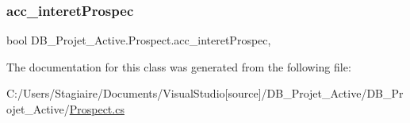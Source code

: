 \subsubsection{\texorpdfstring{acc\_interetProspec}{acc\_interetProspec}}
{\footnotesize\ttfamily bool D\+B\+\_\+\+Projet\+\_\+\+Active.\+Prospect.\+acc\+\_\+interet\+Prospec\hspace{0.3cm}{\ttfamily [get]}, {\ttfamily [set]}}



The documentation for this class was generated from the following file\+:\begin{DoxyCompactItemize}
\item 
C\+:/\+Users/\+Stagiaire/\+Documents/\+Visual\+Studio\mbox{[}source\mbox{]}/\+D\+B\+\_\+\+Projet\+\_\+\+Active/\+D\+B\+\_\+\+Projet\+\_\+\+Active/\mbox{\hyperlink{_prospect_8cs}{Prospect.\+cs}}\end{DoxyCompactItemize}
